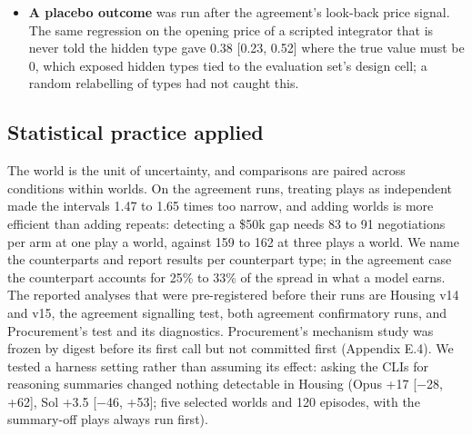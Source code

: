 \begin{itemize}
  the policy seat), and a control may match the reference on at most 10\% of cases. Nine controls played every public
  case, producing 3,468 trajectories with no model: empty, null, full-refund and random legal policies; an
  over-disclosing customer and a first-record customer; a first-sorted intake seat; and a payments seat that moves no
  money. The reference fails the rule on all 11 public cohorts in the policy, customer and payments seats. A full refund
  that collects nothing is fully right on 38 of 180 policy-seat cases, the evidence leaf scores any legal path as
  complete, the customer seat reduces to copying, and the payments seat reduces to how often the answer is no payment.
  Only the intake seat passes.
  These are the original audit's counts. They are not a new lower-control test of the expanded thirteen-cohort
  release or a reanalysis of the model calibration, and neither expansion establishes full quality control.
\item
  \textbf{A placebo outcome} was run after the agreement's look-back price signal. The same regression on the opening price
  of a scripted integrator that is never told the hidden type gave 0.38 {[}0.23, 0.52{]} where the true value must be 0,
  which exposed hidden types tied to the evaluation set's design cell; a random relabelling of types had not caught
  this.
\end{itemize}

\subsection{Statistical practice applied}\label{statistical-practice-applied}

The world is the unit of uncertainty, and comparisons are paired across conditions within worlds. On the agreement
runs, treating plays as independent made the intervals 1.47 to 1.65 times too narrow, and adding worlds is more
efficient than adding repeats: detecting a \$50k gap needs 83 to 91 negotiations per arm at one play a world, against 159
to 162 at three plays a world. We name the counterparts and report results per counterpart type; in the agreement case
the counterpart accounts for 25\% to 33\% of the spread in what a model earns. The reported analyses that were
pre-registered before their runs are Housing v14 and v15, the agreement signalling test, both agreement confirmatory
runs, and Procurement's test and its diagnostics. Procurement's mechanism study was frozen by digest before its first call but not committed first (Appendix E.4). We tested a harness setting rather than assuming its effect: asking
the CLIs for reasoning summaries changed nothing detectable in Housing (Opus +17 {[}−28, +62{]}, Sol +3.5 {[}−46, +53{]}; five
selected worlds and 120 episodes, with the summary-off plays always run first).

